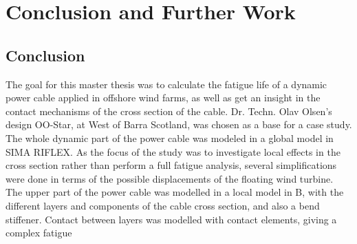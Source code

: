 \chapter{Conclusion and Further Work}
\label{chap:conclusion}
\section{Conclusion}
The goal for this master thesis was to calculate the fatigue life of a dynamic power cable applied in offshore wind farms, as well as get an insight in the contact mechanisms of the cross section of the cable. Dr. Techn. Olav Olsen's design OO-Star, at West of Barra Scotland, was chosen as a base for a case study. The whole dynamic part of the power cable was modeled in a global model in SIMA RIFLEX. As the focus of the study was to investigate local effects in the cross section rather than perform a full fatigue analysis, several simplifications were done in terms of the possible displacements of the floating wind turbine. The upper part of the power cable was modelled in a local model in B, with the different layers and components of the cable cross section, and also a bend stiffener. Contact between layers was modelled with contact elements, giving a complex fatigue   

